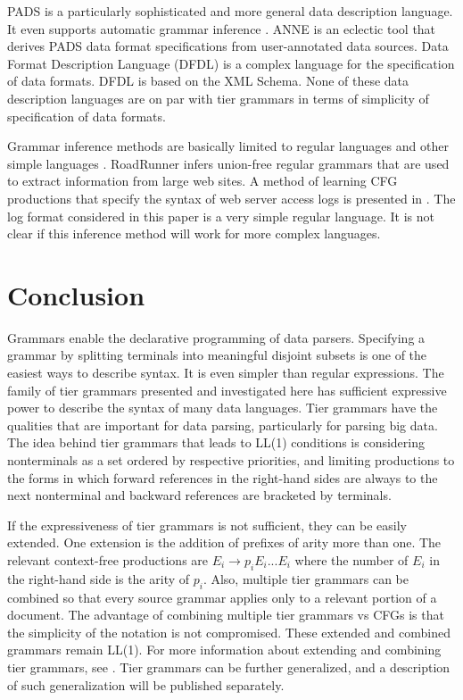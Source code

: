 \documentclass{llncs}
\begin{document}
PADS \cite{Fisher05} is a particularly sophisticated and more general data description language. It even supports automatic grammar inference \cite{Fisher08}. ANNE \cite{Xi10} is an eclectic tool that derives PADS \cite{Fisher05} data format specifications from user-annotated data sources. Data Format Description Language (DFDL) \cite{Powell11} is a complex language for the specification of data formats. DFDL is based on the XML Schema. None of these data description languages are on par with tier grammars in terms of simplicity of specification of data formats. 

Grammar inference methods are basically limited to regular languages and other simple languages \cite{Sakakibara97}. RoadRunner \cite{Crescenzi04} infers union-free regular grammars that are used to extract information from large web sites. A method of learning CFG productions that specify the syntax of web server access logs is presented in \cite{Thakur13}. The log format considered in this paper is a very simple regular language. It is not clear if this inference method will work for more complex languages. 

\section{Conclusion}

Grammars enable the declarative programming of data parsers. Specifying a grammar by splitting terminals into meaningful disjoint subsets is one of the easiest ways to describe syntax. It is even simpler than regular expressions. The family of tier grammars presented and investigated here has sufficient expressive power to describe the syntax of many data languages. Tier grammars have the qualities that are important for data parsing, particularly for parsing big data. The idea behind tier grammars that leads to LL(1) conditions is considering nonterminals as a set ordered by respective priorities, and limiting productions to the forms in which forward references in the right-hand sides are always to the next nonterminal and backward references are bracketed by terminals. 

If the expressiveness of tier grammars is not sufficient, they can be easily extended. One extension is the addition of prefixes of arity more than one. The relevant context-free productions are $E_i \rightarrow p_i E_i ... E_i$ where the number of $E_i$ in the right-hand side is the arity of $p_i$. Also, multiple tier grammars can be combined so that every source grammar applies only to a relevant portion of a document. The advantage of combining multiple tier grammars vs CFGs is that the simplicity of the notation is not compromised. These extended and combined grammars remain LL(1). For more information about extending and combining tier grammars, see \cite{Sakharov15}. Tier grammars can be further generalized, and a description of such generalization will be published separately. 



{\small
}
\end{document}
